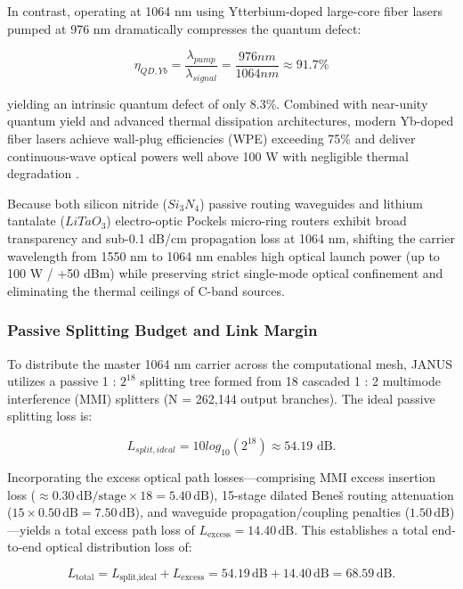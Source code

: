 \documentclass[journal]{IEEEtran}
\begin{document}
In contrast, operating at 1064 nm using Ytterbium-doped large-core fiber lasers pumped at 976 nm dramatically compresses the quantum defect:

\begin{equation}
\eta_{QD,Yb} = \frac{\lambda_{pump}}{\lambda_{signal}}
= \frac{976 nm}{1064 nm} \approx 91.7\% 
\end{equation}

yielding an intrinsic quantum defect of only 8.3\%. Combined with near-unity quantum yield and advanced thermal dissipation architectures, modern Yb-doped fiber lasers achieve wall-plug efficiencies (WPE) exceeding 75\% and deliver continuous-wave optical powers well above 100 W with negligible thermal degradation \cite{Jeong2004}.

Because both silicon nitride ($Si_3N_4$) passive routing waveguides and lithium tantalate ($LiTaO_3$) electro-optic Pockels micro-ring routers exhibit broad transparency and sub-0.1 dB/cm propagation loss at 1064 nm, shifting the carrier wavelength from 1550 nm to 1064 nm enables high optical launch power (up to 100 W / +50 dBm) while preserving strict single-mode optical confinement and eliminating the thermal ceilings of C-band sources.

\subsubsection{\textbf{Passive Splitting Budget and Link Margin}}

To distribute the master 1064 nm carrier across the computational mesh, JANUS utilizes a passive 1 : $2^{18}$ splitting tree formed from
18 cascaded 1 : 2 multimode interference (MMI) splitters (N = 262,144 output branches). The ideal passive splitting loss is:

\begin{equation}
L_{split,ideal} = 10 log_{10}(2^{18}) \approx 54.19 \text{ dB.}
\end{equation}

Incorporating the excess optical path losses---comprising MMI excess insertion loss ($\approx 0.30\,\text{dB/stage} \times 18 = 5.40\,\text{dB}$), 15-stage dilated Beneš routing attenuation ($15 \times 0.50\,\text{dB} = 7.50\,\text{dB}$), and waveguide propagation/coupling penalties ($1.50\,\text{dB}$)---yields a total excess path loss of $L_{\text{excess}} = 14.40\,\text{dB}$. This establishes a total end-to-end optical distribution loss of:

\begin{equation}
L_{\text{total}} = L_{\text{split,ideal}} + L_{\text{excess}} = 54.19\,\text{dB} + 14.40\,\text{dB} = 68.59\,\text{dB}.
\end{equation}
\end{document}
